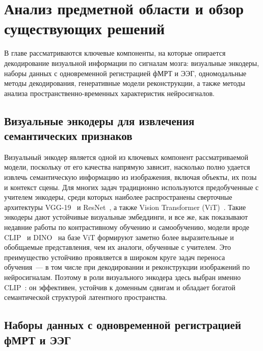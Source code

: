 \section{Анализ предметной области и обзор существующих решений}\label{sec1}

В главе рассматриваются ключевые компоненты, на которые опирается декодирование визуальной информации по сигналам мозга: визуальные энкодеры, наборы данных с одновременной регистрацией фМРТ и ЭЭГ, одномодальные методы декодирования, генеративные модели реконструкции, а также методы анализа пространственно-временных характеристик нейросигналов.

\subsection{Визуальные энкодеры для извлечения семантических признаков}\label{sec1:visual}

Визуальный энкодер является одной из ключевых компонент рассматриваемой модели, поскольку от его качества напрямую зависит, насколько полно удается извлечь семантическую информацию из изображения, включая объекты, их позы и контекст сцены. Для многих задач традиционно используются предобученные с учителем энкодеры, среди которых наиболее распространены сверточные архитектуры VGG-19~\cite{simonyan2015deepconvolutionalnetworkslargescale} и ResNet~\cite{he2015deep}, а также Vision Transformer (ViT)~\cite{dosovitskiy2021imageworth16x16words}. Такие энкодеры дают устойчивые визуальные эмбеддинги, и все же, как показывают недавние работы по контрастивному обучению и самообучению, модели вроде CLIP~\cite{radford2021learning} и DINO~\cite{caron2021emergingpropertiesselfsupervisedvision} на базе ViT формируют заметно более выразительные и обобщаемые представления, чем их аналоги, обученные с учителем. Это преимущество устойчиво проявляется в широком круге задач переноса обучения~--- в том числе при декодировании и реконструкции изображений по нейросигналам. Поэтому в роли визуального энкодера здесь выбран именно CLIP~\cite{radford2021learning}: он эффективен, устойчив к доменным сдвигам и обладает богатой семантической структурой латентного пространства.

\subsection{Наборы данных с одновременной регистрацией фМРТ и ЭЭГ}\label{sec1:datasets}

